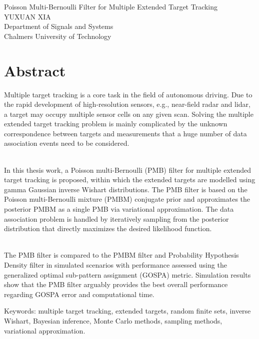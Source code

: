 Poisson Multi-Bernoulli Filter for Multiple Extended Target Tracking\\
YUXUAN XIA\\
Department of Signals and Systems\\
Chalmers University of Technology
\setlength{\parskip}{0.5cm}

\thispagestyle{plain}			%
\setlength{\parskip}{0pt plus 1.0pt}
\section*{Abstract}
Multiple target tracking is a core task in the field of autonomous driving. Due to the rapid development of high-resolution sensors, e.g., near-field radar and lidar, a target may occupy multiple sensor cells on any given scan. Solving the multiple extended target tracking problem is mainly complicated by the unknown correspondence between targets and measurements that a huge number of data association events need to be considered.

~\\
In this thesis work, a Poisson multi-Bernoulli (PMB) filter for multiple extended target tracking is proposed, within which the extended targets are modelled using gamma Gaussian inverse Wishart distributions. The PMB filter is based on the Poisson multi-Bernoulli mixture (PMBM) conjugate prior and approximates the posterior PMBM as a single PMB via variational approximation. The data association problem is handled by iteratively sampling from the posterior distribution that directly maximizes the desired likelihood function. 

~\\
The PMB filter is compared to the PMBM filter and Probability Hypothesis Density filter in simulated scenarios with performance assessed using the generalized optimal sub-pattern assignment (GOSPA) metric. Simulation results show that the PMB filter arguably provides the best overall performance regarding GOSPA error and computational time. 



\vfill
Keywords: multiple target tracking, extended targets, random finite sets, inverse Wishart, Bayesian inference, Monte Carlo methods, sampling methods, variational approximation.

\newpage				%
\thispagestyle{empty}
\mbox{}